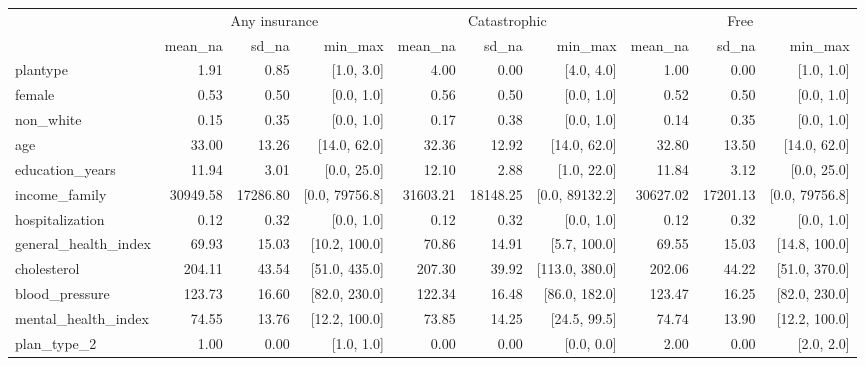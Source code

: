 \documentclass[
  letterpaper,
  DIV=11,
  numbers=noendperiod]{scrartcl}
\begin{document}
\begin{table}
\centering
\begin{tabular}[t]{lrrrrrrrrr}
\toprule
\multicolumn{1}{c}{ } & \multicolumn{3}{c}{Any insurance} & \multicolumn{3}{c}{Catastrophic} & \multicolumn{3}{c}{Free} \\
\cmidrule(l{3pt}r{3pt}){2-4} \cmidrule(l{3pt}r{3pt}){5-7} \cmidrule(l{3pt}r{3pt}){8-10}
  & mean_na & sd_na & min_max & mean_na & sd_na & min_max & mean_na & sd_na & min_max\\
\midrule
plantype & \num{1.91} & \num{0.85} & {}[1.0, 3.0] & \num{4.00} & \num{0.00} & {}[4.0, 4.0] & \num{1.00} & \num{0.00} & {}[1.0, 1.0]\\
female & \num{0.53} & \num{0.50} & {}[0.0, 1.0] & \num{0.56} & \num{0.50} & {}[0.0, 1.0] & \num{0.52} & \num{0.50} & {}[0.0, 1.0]\\
non\_white & \num{0.15} & \num{0.35} & {}[0.0, 1.0] & \num{0.17} & \num{0.38} & {}[0.0, 1.0] & \num{0.14} & \num{0.35} & {}[0.0, 1.0]\\
age & \num{33.00} & \num{13.26} & {}[14.0, 62.0] & \num{32.36} & \num{12.92} & {}[14.0, 62.0] & \num{32.80} & \num{13.50} & {}[14.0, 62.0]\\
education\_years & \num{11.94} & \num{3.01} & {}[0.0, 25.0] & \num{12.10} & \num{2.88} & {}[1.0, 22.0] & \num{11.84} & \num{3.12} & {}[0.0, 25.0]\\
income\_family & \num{30949.58} & \num{17286.80} & {}[0.0, 79756.8] & \num{31603.21} & \num{18148.25} & {}[0.0, 89132.2] & \num{30627.02} & \num{17201.13} & {}[0.0, 79756.8]\\
hospitalization & \num{0.12} & \num{0.32} & {}[0.0, 1.0] & \num{0.12} & \num{0.32} & {}[0.0, 1.0] & \num{0.12} & \num{0.32} & {}[0.0, 1.0]\\
general\_health\_index & \num{69.93} & \num{15.03} & {}[10.2, 100.0] & \num{70.86} & \num{14.91} & {}[5.7, 100.0] & \num{69.55} & \num{15.03} & {}[14.8, 100.0]\\
cholesterol & \num{204.11} & \num{43.54} & {}[51.0, 435.0] & \num{207.30} & \num{39.92} & {}[113.0, 380.0] & \num{202.06} & \num{44.22} & {}[51.0, 370.0]\\
blood\_pressure & \num{123.73} & \num{16.60} & {}[82.0, 230.0] & \num{122.34} & \num{16.48} & {}[86.0, 182.0] & \num{123.47} & \num{16.25} & {}[82.0, 230.0]\\
mental\_health\_index & \num{74.55} & \num{13.76} & {}[12.2, 100.0] & \num{73.85} & \num{14.25} & {}[24.5, 99.5] & \num{74.74} & \num{13.90} & {}[12.2, 100.0]\\
plan\_type\_2 & \num{1.00} & \num{0.00} & {}[1.0, 1.0] & \num{0.00} & \num{0.00} & {}[0.0, 0.0] & \num{2.00} & \num{0.00} & {}[2.0, 2.0]\\
\bottomrule
\end{tabular}
\end{table}
\end{document}
